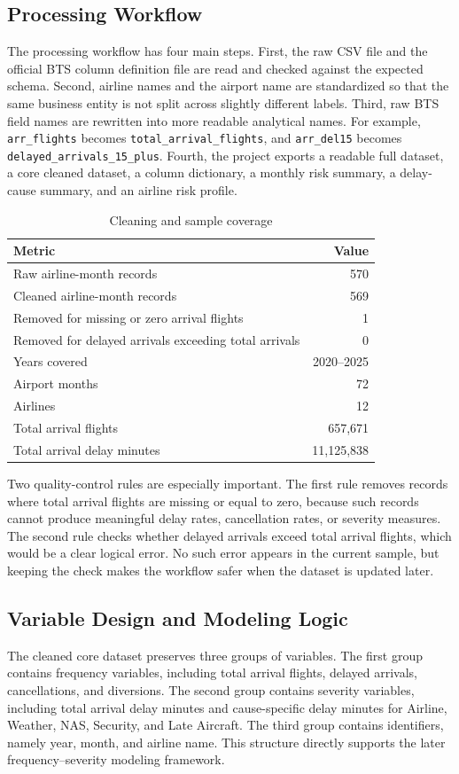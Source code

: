 \documentclass[11pt]{article}
\begin{document}
\subsection{Processing Workflow}
The processing workflow has four main steps. First, the raw CSV file and the official BTS column definition file are read and checked against the expected schema. Second, airline names and the airport name are standardized so that the same business entity is not split across slightly different labels. Third, raw BTS field names are rewritten into more readable analytical names. For example, \texttt{arr\_flights} becomes \texttt{total\_arrival\_flights}, and \texttt{arr\_del15} becomes \texttt{delayed\_arrivals\_15\_plus}. Fourth, the project exports a readable full dataset, a core cleaned dataset, a column dictionary, a monthly risk summary, a delay-cause summary, and an airline risk profile.

\begin{table}[H]
\centering
\caption{Cleaning and sample coverage}
\begin{tabular}{lr}
\toprule
Metric & Value \\
\midrule
Raw airline-month records & 570 \\
Cleaned airline-month records & 569 \\
Removed for missing or zero arrival flights & 1 \\
Removed for delayed arrivals exceeding total arrivals & 0 \\
Years covered & 2020--2025 \\
Airport months & 72 \\
Airlines & 12 \\
Total arrival flights & 657,671 \\
Total arrival delay minutes & 11,125,838 \\
\bottomrule
\end{tabular}
\end{table}

Two quality-control rules are especially important. The first rule removes records where total arrival flights are missing or equal to zero, because such records cannot produce meaningful delay rates, cancellation rates, or severity measures. The second rule checks whether delayed arrivals exceed total arrival flights, which would be a clear logical error. No such error appears in the current sample, but keeping the check makes the workflow safer when the dataset is updated later.

\subsection{Variable Design and Modeling Logic}
The cleaned core dataset preserves three groups of variables. The first group contains frequency variables, including total arrival flights, delayed arrivals, cancellations, and diversions. The second group contains severity variables, including total arrival delay minutes and cause-specific delay minutes for Airline, Weather, NAS, Security, and Late Aircraft. The third group contains identifiers, namely year, month, and airline name. This structure directly supports the later frequency--severity modeling framework.
\end{document}

